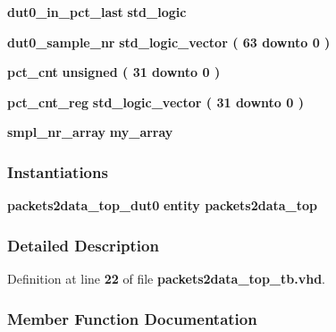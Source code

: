 \begin{DoxyCompactItemize}
\item 
{\bf dut0\+\_\+in\+\_\+pct\+\_\+last} {\bfseries \textcolor{comment}{std\+\_\+logic}\textcolor{vhdlchar}{ }} 
\item 
{\bf dut0\+\_\+sample\+\_\+nr} {\bfseries \textcolor{comment}{std\+\_\+logic\+\_\+vector}\textcolor{vhdlchar}{ }\textcolor{vhdlchar}{(}\textcolor{vhdlchar}{ }\textcolor{vhdlchar}{ } \textcolor{vhdldigit}{63} \textcolor{vhdlchar}{ }\textcolor{keywordflow}{downto}\textcolor{vhdlchar}{ }\textcolor{vhdlchar}{ } \textcolor{vhdldigit}{0} \textcolor{vhdlchar}{ }\textcolor{vhdlchar}{)}\textcolor{vhdlchar}{ }} 
\item 
{\bf pct\+\_\+cnt} {\bfseries \textcolor{comment}{unsigned}\textcolor{vhdlchar}{ }\textcolor{vhdlchar}{(}\textcolor{vhdlchar}{ }\textcolor{vhdlchar}{ } \textcolor{vhdldigit}{31} \textcolor{vhdlchar}{ }\textcolor{keywordflow}{downto}\textcolor{vhdlchar}{ }\textcolor{vhdlchar}{ } \textcolor{vhdldigit}{0} \textcolor{vhdlchar}{ }\textcolor{vhdlchar}{)}\textcolor{vhdlchar}{ }} 
\item 
{\bf pct\+\_\+cnt\+\_\+reg} {\bfseries \textcolor{comment}{std\+\_\+logic\+\_\+vector}\textcolor{vhdlchar}{ }\textcolor{vhdlchar}{(}\textcolor{vhdlchar}{ }\textcolor{vhdlchar}{ } \textcolor{vhdldigit}{31} \textcolor{vhdlchar}{ }\textcolor{keywordflow}{downto}\textcolor{vhdlchar}{ }\textcolor{vhdlchar}{ } \textcolor{vhdldigit}{0} \textcolor{vhdlchar}{ }\textcolor{vhdlchar}{)}\textcolor{vhdlchar}{ }} 
\item 
{\bf smpl\+\_\+nr\+\_\+array} {\bfseries {\bfseries {\bf my\+\_\+array}} \textcolor{vhdlchar}{ }} 
\end{DoxyCompactItemize}
\subsubsection*{Instantiations}
 \begin{DoxyCompactItemize}
\item 
{\bf packets2data\+\_\+top\+\_\+dut0}  {\bfseries entity packets2data\+\_\+top}   
\end{DoxyCompactItemize}


\subsubsection{Detailed Description}


Definition at line {\bf 22} of file {\bf packets2data\+\_\+top\+\_\+tb.\+vhd}.



\subsubsection{Member Function Documentation}
